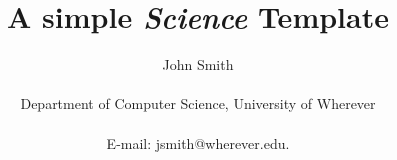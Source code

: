 
\title{A simple {\it Science\/} Template} 



\author
{John Smith\\
\\
\normalsize{Department of Computer Science, University of Wherever}\\
\\
\normalsize{E-mail:  jsmith@wherever.edu.}
}


\date{}

